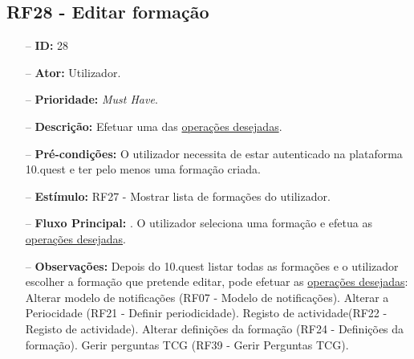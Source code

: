 \subsection{RF28 - Editar formação}
\begin{itemize}
	\item[--] \textbf{ID:} 28
	\item[--]  \textbf{Ator:} Utilizador.
	\item[--]  \textbf{Prioridade:} \textit{Must Have}.
	\item[--]  \textbf{Descrição:} Efetuar uma das \underline{operações desejadas}.
	\item[--]  \textbf{Pré-condições:} O utilizador necessita de estar autenticado na plataforma 10.quest e ter pelo menos uma formação criada.
	\item[--]  \textbf{Estímulo:} RF27 - Mostrar lista de formações do utilizador.
	\item[--]  \textbf{Fluxo Principal:} 
		. O utilizador seleciona uma formação e efetua as \underline{operações desejadas}.
	\begin{comment}
	\item[--]  \textbf{Fluxo de Excepção:} 
		\subitem 1a. O 10.quest não consegue efetuar o pedido à API do TCG devido a uma falha na conexão.
		\subitem 1a1. O 10.quest notifica o utilizador que ocorreu uma falha na conexão.
		\subitem 1b. O serviço do TCG (API) está indisponível.
		\subitem 1b1. O 10.quest notifica o utilizador que o serviço do TCG está temporariamente indisponível.
	\end{comment} 
	\item[--]  \textbf{Observações:} Depois do 10.quest listar todas as formações e o utilizador escolher a formação que pretende editar, pode efetuar as \underline{operações desejadas}:
		\subitem Alterar modelo de notificações (RF07 - Modelo de notificações).
		\subitem Alterar a Periocidade (RF21 - Definir periodicidade).
		\subitem Registo de actividade(RF22 - Registo de actividade).
		\subitem Alterar definições da formação (RF24 - Definições da formação).
		\subitem Gerir perguntas TCG (RF39 - Gerir Perguntas TCG).
\end{itemize}
\newpage

